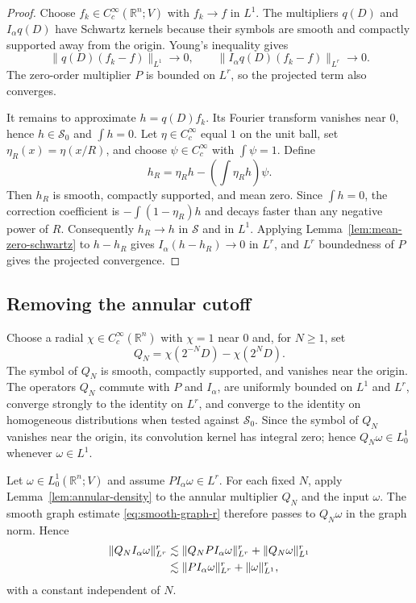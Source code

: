\documentclass[11pt]{amsart}
\numberwithin{equation}{section}
\theoremstyle{definition}
\theoremstyle{remark}
\newcommand{\R}{\mathbb R}
\newcommand{\cS}{\mathcal S}
\newcommand{\norm}[1]{\lVert #1\rVert}
\begin{document}
\begin{proof}
Choose $f_k\in C_c^\infty(\R^n;V)$ with $f_k\to f$ in $L^1$.  The multipliers
$q(D)$ and $I_\alpha q(D)$ have Schwartz kernels because their symbols are
smooth and compactly supported away from the origin.  Young's inequality gives
\[
 \norm{q(D)(f_k-f)}_{L^1}\to0,
 \qquad
 \norm{I_\alpha q(D)(f_k-f)}_{L^r}\to0.
\]
The zero-order multiplier $P$ is bounded on $L^r$, so the projected term also
converges.

It remains to approximate $h=q(D)f_k$.  Its Fourier transform vanishes near
$0$, hence $h\in\cS_0$ and $\int h=0$.  Let $\eta\in C_c^\infty$ equal $1$ on
the unit ball, set $\eta_R(x)=\eta(x/R)$, and choose
$\psi\in C_c^\infty$ with $\int\psi=1$.  Define
\begin{equation}\label{eq:cutoff-correction}
 h_R=\eta_R h-\left(\int\eta_Rh\right)\psi.
\end{equation}
Then $h_R$ is smooth, compactly supported, and mean zero.  Since
$\int h=0$, the correction coefficient is
$-\int(1-\eta_R)h$ and decays faster than any negative power of $R$.
Consequently $h_R\to h$ in $\cS$ and in $L^1$.  Applying
Lemma~\ref{lem:mean-zero-schwartz} to $h-h_R$ gives
$I_\alpha(h-h_R)\to0$ in $L^r$, and $L^r$ boundedness of $P$ gives the
projected convergence.
\end{proof}

\subsection{Removing the annular cutoff}
Choose a radial $\chi\in C_c^\infty(\R^n)$ with $\chi=1$ near $0$ and, for
$N\ge1$, set
\begin{equation}\label{eq:QN}
 Q_N=\chi(2^{-N}D)-\chi(2^N D).
\end{equation}
The symbol of $Q_N$ is smooth, compactly supported, and vanishes near the
origin.  The operators $Q_N$ commute with $P$ and $I_\alpha$, are uniformly
bounded on $L^1$ and $L^r$, converge strongly to the identity on $L^r$, and
converge to the identity on homogeneous distributions when tested against
$\cS_0$.  Since the symbol of $Q_N$ vanishes near the origin, its convolution
kernel has integral zero; hence $Q_N\omega\in L^1_0$ whenever
$\omega\in L^1$.

Let $\omega\in L^1_0(\R^n;V)$ and assume
$P I_\alpha\omega\in L^r$.  For each fixed $N$, apply
Lemma~\ref{lem:annular-density} to the annular multiplier $Q_N$ and the input
$\omega$.  The smooth graph estimate \eqref{eq:smooth-graph-r} therefore
passes to $Q_N\omega$ in the graph norm.  Hence
\begin{align}\label{eq:QN-bound}
 \norm{Q_N I_\alpha\omega}_{L^r}^r
 &\lesssim
 \norm{Q_N P I_\alpha\omega}_{L^r}^r
 +\norm{Q_N\omega}_{L^1}^r\notag\\
 &\lesssim
 \norm{P I_\alpha\omega}_{L^r}^r+\norm{\omega}_{L^1}^r,
\end{align}
with a constant independent of $N$.
\end{document}
